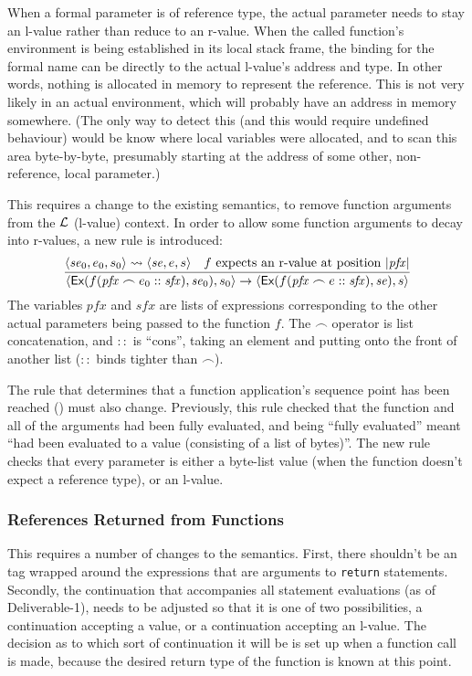 \documentclass[11pt]{article}
\begin{document}
When a formal parameter is of reference type, the actual parameter
needs to stay an l-value rather than reduce to an r-value.  When the
called function's environment is being established in its local stack
frame, the binding for the formal name can be directly to the actual
l-value's address and type.  In other words, nothing is allocated in
memory to represent the reference.  This is not very likely in an
actual environment, which will probably have an address in memory
somewhere.  (The only way to detect this (and this would require
undefined behaviour) would be know where local variables were
allocated, and to scan this area byte-by-byte, presumably starting at
the address of some other, non-reference, local parameter.)

This requires a change to the existing semantics, to remove function
arguments from the $\cal L$ (l-value) context.  In order to allow some
function arguments to decay into r-values, a new rule
 is introduced:
\[
\infer{
  \statebrack{\textsf{Ex}(f(\mathit{pfx} \frown e_0 ::
    \mathit{sfx}),
    \mathit{se}_0),s_0}
  \rightarrow
  \statebrack{\textsf{Ex}(f(\mathit{pfx}\frown e ::
    \mathit{sfx}),\mathit{se}),
    s}}{%
  \statebrack{\mathit{se}_0,e_0,s_0}\lvtorv\statebrack{\mathit{se},e,s} &
  f\mbox{ expects an r-value at position }|\mathit{pfx}|}
\]
The variables $\mathit{pfx}$ and $\mathit{sfx}$ are lists of
expressions corresponding to the other actual parameters being passed
to the function $f$.  The $\frown$ operator is list concatenation, and
$::$ is ``cons'', taking an element and putting onto the front of
another list ($::$ binds tighter than $\frown$).

The rule that determines that a function application's sequence point
has been reached () must also change.
Previously, this rule checked that the function and all of the
arguments had been fully evaluated, and being ``fully evaluated''
meant ``had been evaluated to a value (consisting of a list of
bytes)''.  The new rule checks that every parameter is either a
byte-list value (when the function doesn't expect a reference type),
or an l-value.

\subsubsection{References Returned from Functions}

This requires a number of changes to the semantics.  First, there
shouldn't be an \crvreq{} tag wrapped around the expressions that are
arguments to \texttt{return} statements.  Secondly, the continuation
that accompanies all statement evaluations (as of Deliverable-1),
needs to be adjusted so that it is one of two possibilities, a
continuation accepting a value, or a continuation accepting an
l-value.  The decision as to which sort of continuation it will be is
set up when a function call is made, because the desired return type
of the function is known at this point.
\end{document}
